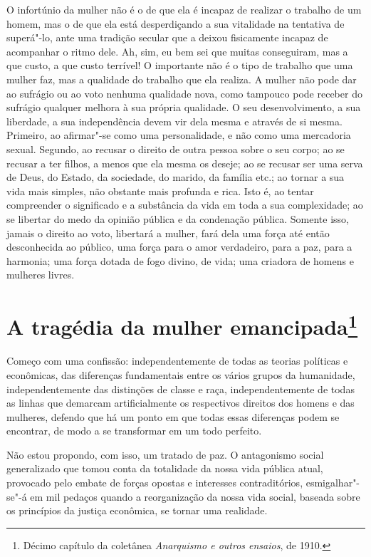 O infortúnio da mulher não é o de que ela é incapaz de realizar o
trabalho de um homem, mas o de que ela está desperdiçando a sua
vitalidade na tentativa de superá"-lo, ante uma tradição secular que a\label{secular}
deixou fisicamente incapaz de acompanhar o ritmo dele. Ah, sim, eu bem
sei que muitas conseguiram, mas a que custo, a que custo terrível! O
importante não é o tipo de trabalho que uma mulher faz, mas a qualidade
do trabalho que ela realiza. A mulher não pode dar ao sufrágio ou ao
voto nenhuma qualidade nova, como tampouco pode receber do sufrágio
qualquer melhora à sua própria qualidade. O seu desenvolvimento, a sua
liberdade, a sua independência devem vir dela mesma e através de si
mesma. Primeiro, ao afirmar"-se como uma personalidade, e não como uma
mercadoria sexual. Segundo, ao recusar o direito de outra pessoa sobre o
seu corpo; ao se recusar a ter filhos, a menos que ela mesma os deseje;
ao se recusar ser uma serva de Deus, do Estado, da sociedade, do marido,
da família etc.; ao tornar a sua vida mais simples, não obstante mais
profunda e rica. Isto é, ao tentar compreender o significado e a substância
da vida em toda a sua complexidade; ao se libertar do medo da opinião
pública e da condenação pública. Somente isso, jamais o direito ao voto,
libertará a mulher, fará dela uma força até então desconhecida ao
público, uma força para o amor verdadeiro, para a paz, para a harmonia;
uma força dotada de fogo divino, de vida; uma criadora de homens e
mulheres livres.

\chapter{A tragédia da mulher emancipada\footnote{Décimo capítulo da coletânea
  \textit{Anarquismo e outros ensaios}, de 1910.}}

Começo com uma confissão: independentemente de todas as teorias
políticas e econômicas, das diferenças fundamentais entre os vários
grupos da humanidade, independentemente das distinções de classe e raça,
independentemente de todas as linhas que demarcam artificialmente os
respectivos direitos dos homens e das mulheres, defendo que há um ponto
em que todas essas diferenças podem se encontrar, de modo a se
transformar em um todo perfeito.\label{perfeito}

Não estou propondo, com isso, um tratado de paz. O antagonismo social
generalizado que tomou conta da totalidade da nossa vida pública atual,
provocado pelo embate de forças opostas e interesses contraditórios,
esmigalhar"-se"-á em mil pedaços quando a reorganização da nossa vida
social, baseada sobre os princípios da justiça econômica, se tornar uma
realidade.

